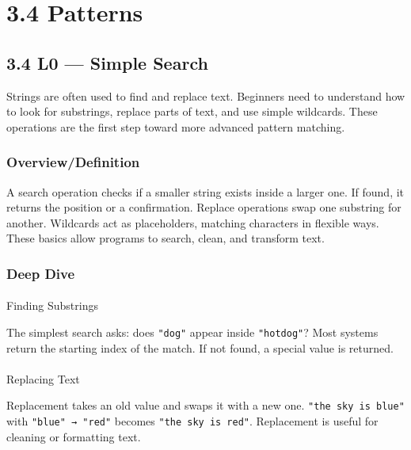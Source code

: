 \documentclass[
  letterpaper,
  DIV=11,
  numbers=noendperiod]{scrreprt}
\makeatletter
\let\oldparagraph\paragraph
\renewcommand{\paragraph}{
    \@ifstar
      \xxxParagraphStar
      \xxxParagraphNoStar
  }
\newcommand{\xxxParagraphStar}[1]{\oldparagraph*{#1}\mbox{}}
\newcommand{\xxxParagraphNoStar}[1]{\oldparagraph{#1}\mbox{}}
\makeatother
\begin{document}
\section{3.4 Patterns}\label{patterns}

\subsection{3.4 L0 --- Simple Search}\label{l0-simple-search}

Strings are often used to find and replace text. Beginners need to
understand how to look for substrings, replace parts of text, and use
simple wildcards. These operations are the first step toward more
advanced pattern matching.

\subsubsection{Overview/Definition}\label{overviewdefinition-2}

A search operation checks if a smaller string exists inside a larger
one. If found, it returns the position or a confirmation. Replace
operations swap one substring for another. Wildcards act as
placeholders, matching characters in flexible ways. These basics allow
programs to search, clean, and transform text.

\subsubsection{Deep Dive}\label{deep-dive-31}

\paragraph{Finding Substrings}\label{finding-substrings}

The simplest search asks: does \texttt{"dog"} appear inside
\texttt{"hotdog"}? Most systems return the starting index of the match.
If not found, a special value is returned.

\paragraph{Replacing Text}\label{replacing-text}

Replacement takes an old value and swaps it with a new one.
\texttt{"the\ sky\ is\ blue"} with \texttt{"blue"\ →\ "red"} becomes
\texttt{"the\ sky\ is\ red"}. Replacement is useful for cleaning or
formatting text.
\end{document}
